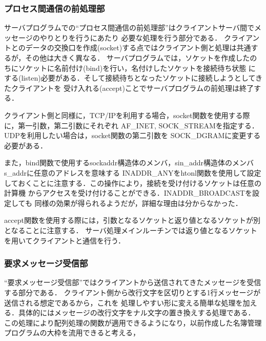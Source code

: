 \documentclass[a4paper,11pt]{jarticle}
\begin{document}
\subsubsection{プロセス間通信の前処理部} \label{sec:pre}

サーバプログラムでの``プロセス間通信の前処理部''はクライアントサーバ間でメッセージのやりとりを行うにあたり
必要な処理を行う部分である．
クライアントとのデータの交換口を作成(socket)する点ではクライアント側と処理は共通するが，その他は大きく異なる．
サーバプログラムでは，ソケットを作成したのちにソケットに名前付け(bind)を行い，名付けしたソケットを接続待ち状態
にする(listen)必要がある．そして接続待ちとなったソケットに接続しようとしてきたクライアントを
受け入れる(accept)ことでサーバプログラムの前処理は終了する．

クライアント側と同様に，TCP/IPを利用する場合，socket関数を使用する際に，第一引数，第二引数にそれぞれ
AF\_INET, SOCK\_STREAMを指定する．UDPを利用したい場合は，socket関数の第二引数を
SOCK\_DGRAMに変更する必要がある．

また，bind関数で使用するsockaddr構造体のメンバ，sin\_addr構造体のメンバs\_addrに任意のアドレスを意味する
INADDR\_ANYをhtonl関数を使用して設定しておくことに注意する．この操作により，接続を受け付けるソケットは任意の計算機
からアクセスを受け付けることができる．INADDR\_BROADCASTを設定しても
同様の効果が得られるようだが，詳細な理由は分からなかった．

accept関数を使用する際には，引数となるソケットと返り値となるソケットが別となることに注意する．
サーバ処理メインルーチンでは返り値となるソケットを用いてクライアントと通信を行う．

\subsubsection{要求メッセージ受信部} \label{sec:send}

``要求メッセージ受信部''ではクライアントから送信されてきたメッセージを受信する部分である．
クライアント側から改行文字を区切りとする1行メッセージが送信される想定であるから，これを
処理しやすい形に変える簡単な処理を加える．具体的にはメッセージの改行文字をナル文字の置き換えする処理である．
この処理により配列処理の関数が適用できるようになり，以前作成した名簿管理プログラムの大枠を流用できると考える，
\end{document}
